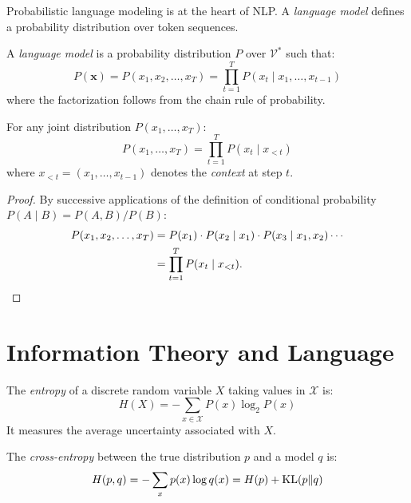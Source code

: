 Probabilistic language modeling is at the heart of NLP. A \emph{language model}
defines a probability distribution over token sequences.

\begin{definition}
A \emph{language model} is a probability distribution $P$ over $\mathcal{V}^*$
such that:
\[
P(\mathbf{x}) = P(x_1, x_2, \ldots, x_T) = \prod_{t=1}^{T} P(x_t \mid x_1, \ldots, x_{t-1})
\]
where the factorization follows from the chain rule of probability.
\end{definition}

\begin{theorem}
For any joint distribution $P(x_1, \ldots, x_T)$:
\[
P(x_1, \ldots, x_T) = \prod_{t=1}^{T} P(x_t \mid x_{<t})
\]
where $x_{<t} = (x_1, \ldots, x_{t-1})$ denotes the \emph{context} at step $t$.
\end{theorem}

\begin{proof}
By successive applications of the definition of conditional probability
$P(A \mid B) = P(A, B) / P(B)$:
\begin{align*}
P(x_1, x_2, \ldots, x_T) &= P(x_1) \cdot P(x_2 \mid x_1) \cdot P(x_3 \mid x_1, x_2) \cdots \\
                           &= \prod_{t=1}^{T} P(x_t \mid x_{<t}). \qedhere
\end{align*}
\end{proof}

\section{Information Theory and Language}
\label{sec:intro:info}

\begin{definition}[Entropy]
The \emph{entropy} of a discrete random variable $X$ taking values in
$\mathcal{X}$ is:
\[
H(X) = -\sum_{x \in \mathcal{X}} P(x) \log_2 P(x)
\]
It measures the average uncertainty associated with $X$.
\end{definition}

\begin{definition}
The \emph{cross-entropy} between the true distribution $p$ and a model $q$ is:
\[
H(p, q) = -\sum_{x} p(x) \log q(x) = H(p) + \mathrm{KL}(p \| q)
\]
\end{definition}

